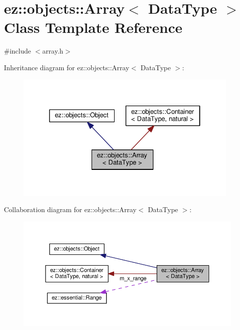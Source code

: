 \hypertarget{classez_1_1objects_1_1Array}{}\section{ez\+:\+:objects\+:\+:Array$<$ Data\+Type $>$ Class Template Reference}
\label{classez_1_1objects_1_1Array}


{\ttfamily \#include $<$array.\+h$>$}



Inheritance diagram for ez\+:\+:objects\+:\+:Array$<$ Data\+Type $>$\+:
\nopagebreak
\begin{figure}[H]
\begin{center}
\leavevmode
\includegraphics[width=310pt]{classez_1_1objects_1_1Array__inherit__graph}
\end{center}
\end{figure}


Collaboration diagram for ez\+:\+:objects\+:\+:Array$<$ Data\+Type $>$\+:
\nopagebreak
\begin{figure}[H]
\begin{center}
\leavevmode
\includegraphics[width=350pt]{classez_1_1objects_1_1Array__coll__graph}
\end{center}
\end{figure}

